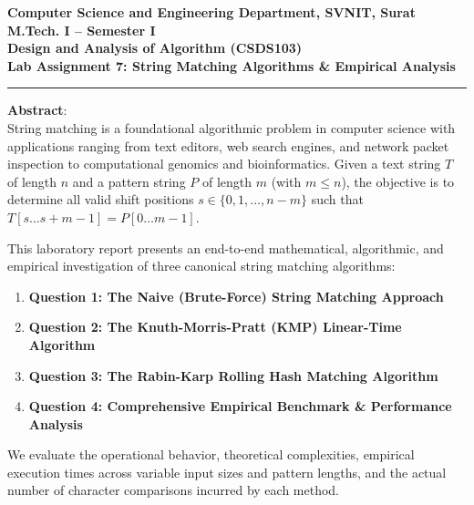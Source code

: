 \documentclass[12pt]{article}
\begin{document}
\begin{center}
\textbf{\Large Computer Science and Engineering Department, SVNIT, Surat}\\[4pt]
\textbf{\large M.Tech. I -- Semester I}\\[3pt]
\textbf{\large Design and Analysis of Algorithm (CSDS103)}\\[4pt]
\textbf{\Large Lab Assignment 7: String Matching Algorithms \& Empirical Analysis}
\end{center}

\vspace{0.2cm}
\hrule
\vspace{0.4cm}

\textbf{Abstract}:\\
String matching is a foundational algorithmic problem in computer science with applications ranging from text editors, web search engines, and network packet inspection to computational genomics and bioinformatics. Given a text string $T$ of length $n$ and a pattern string $P$ of length $m$ (with $m \le n$), the objective is to determine all valid shift positions $s \in \{0, 1, \dots, n-m\}$ such that $T[s \dots s+m-1] = P[0 \dots m-1]$. 

This laboratory report presents an end-to-end mathematical, algorithmic, and empirical investigation of three canonical string matching algorithms:
\begin{enumerate}
    \item \textbf{Question 1: The Naive (Brute-Force) String Matching Approach}
    \item \textbf{Question 2: The Knuth-Morris-Pratt (KMP) Linear-Time Algorithm}
    \item \textbf{Question 3: The Rabin-Karp Rolling Hash Matching Algorithm}
    \item \textbf{Question 4: Comprehensive Empirical Benchmark \& Performance Analysis}
\end{enumerate}
We evaluate the operational behavior, theoretical complexities, empirical execution times across variable input sizes and pattern lengths, and the actual number of character comparisons incurred by each method.

\vspace{0.4cm}

\end{document}
